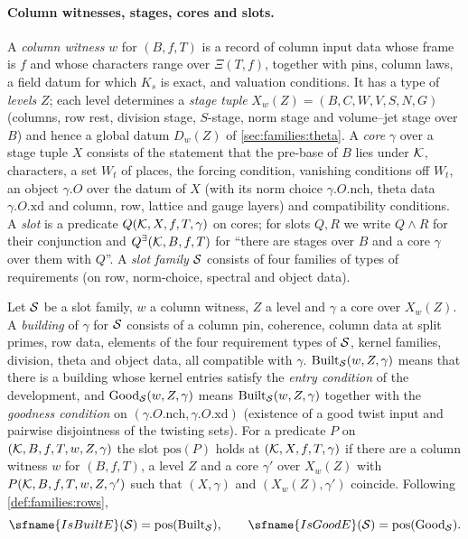 \paragraph{Column witnesses, stages, cores and slots.}
A \emph{column witness} $w$ for $(B,f,T)$ is a record of column input data whose frame is $f$ and whose characters range
over $\Xi(T,f)$, together with pins, column laws, a field datum for which $K_s$ is exact, and valuation conditions. It has a
type of \emph{levels} $Z$; each level determines a \emph{stage tuple} $X_w(Z)=(B,C,W,V,S,N,G)$ (columns, row rest, division
stage, $S$-stage, norm stage and volume--jet stage over $B$) and hence a global datum $D_w(Z)$ of
\cref{sec:families:theta}. A \emph{core} $\gamma$ over a stage tuple $X$ consists of the statement that the pre-base of $B$ lies
under $\mathcal K$, characters, a set $W_t$ of places, the forcing condition, vanishing conditions off $W_t$, an object
$\gamma.O$ over the datum of $X$ (with its norm choice $\gamma.O.\mathrm{nch}$, theta data $\gamma.O.\mathrm{xd}$ and column, row,
lattice and gauge layers) and compatibility conditions. A \emph{slot} is a predicate $Q(\mathcal K,X,f,T,\gamma)$ on cores; for
slots $Q,R$ we write $Q\wedge R$ for their conjunction and $Q^\exists(\mathcal K,B,f,T)$ for ``there are stages over $B$ and a
core $\gamma$ over them with $Q$''. A \emph{slot family} $\mathcal S$ consists of four families of types of requirements (on row,
norm-choice, spectral and object data).

\begin{definition}\label{pf:bundles:def:built}
Let $\mathcal S$ be a slot family, $w$ a column witness, $Z$ a level and $\gamma$ a core over $X_w(Z)$. A \emph{building} of
$\gamma$ for $\mathcal S$ consists of a column pin, coherence, column data at split primes, row data, elements of the four
requirement types of $\mathcal S$, kernel families, division, theta and object data, all compatible with $\gamma$.
$\mathrm{Built}_\mathcal S(w,Z,\gamma)$ means that there is a building whose kernel entries satisfy the \emph{entry condition} of
the development, and $\mathrm{Good}_\mathcal S(w,Z,\gamma)$ means $\mathrm{Built}_\mathcal S(w,Z,\gamma)$ together with the
\emph{goodness condition} on $(\gamma.O.\mathrm{nch},\gamma.O.\mathrm{xd})$ (existence of a good twist input and pairwise
disjointness of the twisting sets). For a predicate $P$ on $(\mathcal K,B,f,T,w,Z,\gamma)$ the slot $\mathrm{pos}(P)$ holds at
$(\mathcal K,X,f,T,\gamma)$ if there are a column witness $w$ for $(B,f,T)$, a level $Z$ and a core $\gamma'$ over $X_w(Z)$ with
$P(\mathcal K,B,f,T,w,Z,\gamma')$ such that $(X,\gamma)$ and $(X_w(Z),\gamma')$ coincide. Following \cref{def:families:rows},
\[
\sfname{IsBuiltE}(\bundS)=\mathrm{pos}(\mathrm{Built}_\bundS),\qquad \sfname{IsGoodE}(\bundS)=\mathrm{pos}(\mathrm{Good}_\bundS).
\]
\end{definition}

